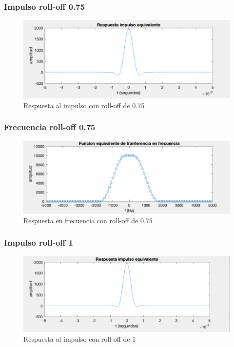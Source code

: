 \subsubsection{Impulso roll-off 0.75} \phantom{text}

\begin{figure}[H]
    \centering
    \includegraphics[scale=0.4]{Imagenes/act 2/rollof0.75imp.pdf}
    \caption{Respuesta al impulso con roll-off de 0.75}
    \label{fig:Respuesta al impulso con roll-off de 0.75}
\end{figure}


\subsubsection{Frecuencia roll-off 0.75} \phantom{text}

\begin{figure}[H]
    \centering
    \includegraphics[scale=0.4]{Imagenes/act 2/rolloff0.75frec.pdf}
    \caption{Respuesta en  frecuencia  con roll-off de 0.75}
    \label{fig:Respuesta en  frecuencia  con roll-off de 0.75}
\end{figure}


\subsubsection{Impulso roll-off 1} \phantom{text}

\begin{figure}[H]
    \centering
    \includegraphics[scale=0.4]{Imagenes/act 2/rolloff1imp.pdf}
    \caption{Respuesta al impulso con roll-off de 1}
    \label{fig:Respuesta al impulso con roll-off de 1}
\end{figure}



